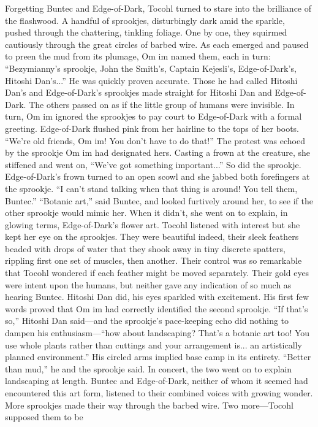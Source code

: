 \documentclass[9pt]{article}
\begin{document}
Forgetting Buntec and Edge-of-Dark, Tocohl turned to stare into the brilliance of the flashwood. A
handful of sprookjes, disturbingly dark amid the sparkle, pushed through the chattering, tinkling foliage.
One by one, they squirmed cautiously through the great circles of barbed wire.
As each emerged and paused to preen the mud from its plumage, Om im named them, each in turn:
“Bezymianny’s sprookje, John the Smith’s, Captain Kejesli’s, Edge-of-Dark’s, Hitoshi Dan’s...”
He was quickly proven accurate. Those he had called Hitoshi Dan’s and Edge-of-Dark’s sprookjes
made straight for Hitoshi Dan and Edge-of-Dark. The others passed on as if the little group of humans
were invisible.
In turn, Om im ignored the sprookjes to pay court to Edge-of-Dark with a formal greeting.
Edge-of-Dark flushed pink from her hairline to the tops of her boots. “We’re old friends, Om im!
You don’t have to do that!” The protest was echoed by the sprookje Om im had designated hers.
Casting a frown at the creature, she stiffened and went on, “We’ve got something important...” So
did the sprookje. Edge-of-Dark’s frown turned to an open scowl and she jabbed both forefingers at the
sprookje. “I can’t stand talking when that thing is around! You tell them, Buntec.”
“Botanic art,” said Buntec, and looked furtively around her, to see if the other sprookje would mimic
her. When it didn’t, she went on to explain, in glowing terms, Edge-of-Dark’s flower art.
Tocohl listened with interest but she kept her eye on the sprookjes. They were beautiful indeed, their
sleek feathers beaded with drops of water that they shook away in tiny discrete spatters, rippling first one
set of muscles, then another. Their control was so remarkable that Tocohl wondered if each feather might
be moved separately. Their gold eyes were intent upon the humans, but neither gave any indication of so
much as hearing Buntec.
Hitoshi Dan did, his eyes sparkled with excitement. His first few words proved that Om im had
correctly identified the second sprookje. “If that’s so,” Hitoshi Dan said—and the sprookje’s
pace-keeping echo did nothing to dampen his enthusiasm—“how about landscaping? That’s a botanic art
too! You use whole plants rather than cuttings and your arrangement is... an artistically planned
environment.” His circled arms implied base camp in its entirety. “Better than mud,” he and the sprookje
said.
In concert, the two went on to explain landscaping at length. Buntec and Edge-of-Dark, neither of
whom it seemed had encountered this art form, listened to their combined voices with growing wonder.
More sprookjes made their way through the barbed wire. Two more—Tocohl supposed them to be
\end{document}
